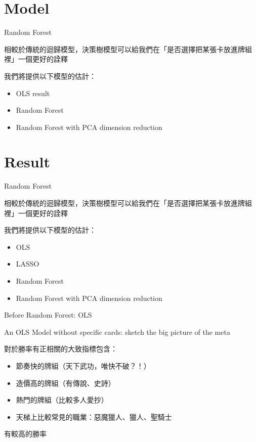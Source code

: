 \documentclass[12pt]{beamer}
\begin{document}
\section{Model}

\begin{frame}[fragile]{Random Forest}

	相較於傳統的迴歸模型，決策樹模型可以給我們在「是否選擇把某張卡放進牌組裡」一個更好的詮釋

	我們將提供以下模型的估計：

	\begin{itemize}
		\item OLS result
		\item Random Forest
		\item Random Forest with PCA dimension reduction
	\end{itemize}

\end{frame}


\section{Result}

\begin{frame}[fragile]{Random Forest}

	相較於傳統的迴歸模型，決策樹模型可以給我們在「是否選擇把某張卡放進牌組裡」一個更好的詮釋

	我們將提供以下模型的估計：

	\begin{itemize}
		\item OLS
		\item LASSO
		\item Random Forest
		\item Random Forest with PCA dimension reduction
	\end{itemize}

\end{frame}


\begin{frame}[fragile]{Before Random Forest: OLS}

An OLS Model without specific cards: sketch the big picture of the meta

對於勝率有正相關的大致指標包含：

	\begin{itemize}
		\item 節奏快的牌組（天下武功，唯快不破？！）
		\item 造價高的牌組（有傳說、史詩）
		\item 熱門的牌組（比較多人愛抄）
		\item 天梯上比較常見的職業：惡魔獵人、獵人、聖騎士
	\end{itemize}
	有較高的勝率


\end{frame}
\end{document}
